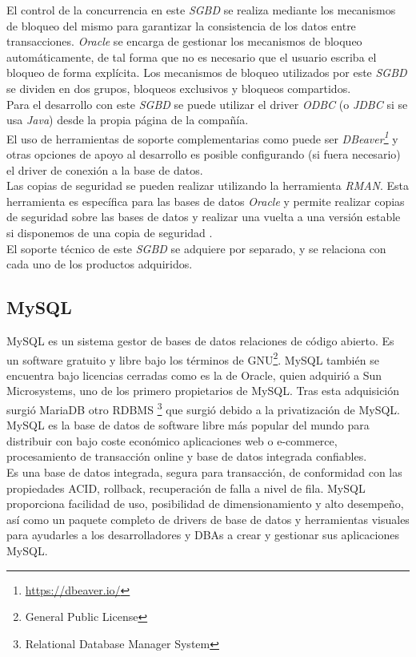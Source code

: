 \documentclass[10pt]{article}
\begin{document}
El control de la concurrencia en este \emph{SGBD} se realiza mediante los mecanismos de bloqueo del mismo para garantizar la consistencia de los datos entre transacciones. \emph{Oracle} se encarga de gestionar los mecanismos de bloqueo automáticamente, de tal forma que no es necesario que el usuario escriba el bloqueo de forma explícita.\cite{ORA:6}
Los mecanismos de bloqueo utilizados por este \emph{SGBD} se dividen en dos grupos, bloqueos exclusivos y bloqueos compartidos. \cite{ORA:7} \\

Para el desarrollo con este \emph{SGBD} se puede utilizar el driver \emph{ODBC} (o \emph{JDBC} si se usa \emph{Java}) desde la propia página de la compañía. \\
El uso de herramientas de soporte complementarias como puede ser \emph{DBeaver\footnote{\url{https://dbeaver.io/}}} y otras opciones de apoyo al desarrollo es posible configurando (si fuera necesario) el driver de conexión a la base de datos. \\
Las copias de seguridad se pueden realizar utilizando la herramienta \emph{RMAN}. Esta herramienta es específica para las bases de datos \emph{Oracle} y permite realizar copias de seguridad sobre las bases de datos y realizar una vuelta a una versión estable si disponemos de una copia de seguridad \cite{ORA:8}. \\

El soporte técnico de este \emph{SGBD} se adquiere por separado, y se relaciona con cada uno de los productos adquiridos. \cite{ORA:4} \\

\subsection{MySQL}
MySQL es un sistema gestor de bases de datos relaciones de código abierto. 
Es un software gratuito y libre bajo los términos de GNU\footnote{General Public License}. MySQL también se encuentra bajo licencias cerradas como es la de Oracle, quien adquirió a Sun Microsystems, uno de los primero propietarios de MySQL. Tras esta adquisición surgió MariaDB otro RDBMS \footnote{Relational Database Manager System} que surgió debido a la privatización de MySQL.\\

MySQL es la base de datos de software libre más popular del mundo para distribuir con bajo coste económico aplicaciones web o e-commerce, procesamiento de transacción online y base de datos integrada confiables.  \\
Es una base de datos integrada, segura para transacción, de conformidad con las propiedades ACID, rollback, recuperación de falla a nivel de fila. MySQL proporciona facilidad de uso, posibilidad de dimensionamiento y alto desempeño, así como un paquete completo de drivers de base de datos y herramientas visuales para ayudarles a los desarrolladores y DBAs a crear y gestionar sus aplicaciones MySQL. \\
\end{document}
